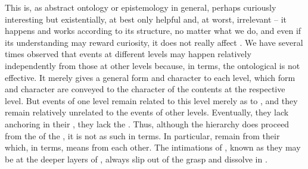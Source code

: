This  is, as abstract ontology or epistemology in general, perhaps
curiously interesting but existentially, at best only helpful and, at worst,
irrelevant -- it happens and works according to its structure, no matter what we
do, and even if its understanding may reward  curiosity, it does not
really affect .  We have several times observed that events at different
levels may happen relatively independently from those at other levels because,
in  terms, the ontological  is not effective.  It
merely gives a general form and character to each level, which form and
character are conveyed to the character of the contents at the respective level.
But events of one level remain related to this level merely as  to
, and they remain relatively unrelated to the events of other levels.
Eventually, they lack anchoring in their , they lack the .  Thus, although the hierarchy does proceed from the  of
the , it is not  as such in  terms.  In
particular,  remain  from their 
which, in  terms, means from each other.  The intimations of
,  known as they may be at the deeper layers of
, always slip out of the   grasp
and dissolve in .

